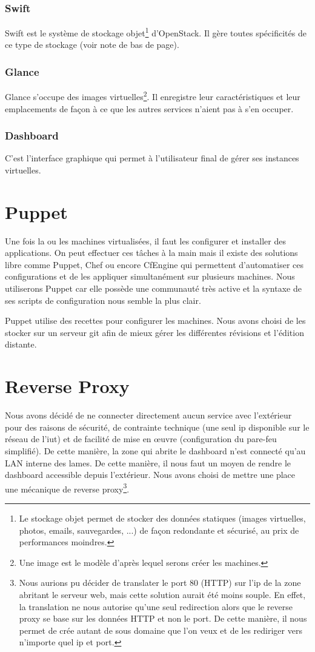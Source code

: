 \documentclass{report}
\begin{document}
\subsubsection{Swift}
Swift est le système de stockage objet\footnote{Le stockage objet permet de stocker des données statiques (images virtuelles, photos, emails, sauvegardes, ...) de façon redondante et sécurisé, au prix de performances moindres.} d'OpenStack. Il gère toutes spécificités de ce type de stockage (voir note de bas de page).

\subsubsection{Glance}
Glance s'occupe des images virtuelles\footnote{Une image est le modèle d'après lequel serons créer les machines.}. Il enregistre leur caractéristiques et leur emplacements de façon à ce que les autres services n'aient pas à s'en occuper.

\subsubsection{Dashboard}
C'est l'interface graphique qui permet à l'utilisateur final de gérer ses instances virtuelles.

\section{Puppet}
Une fois la ou les machines virtualisées, il faut les configurer et installer des applications. On peut effectuer ces tâches à la main mais il existe des solutions libre comme Puppet, Chef ou encore CfEngine qui permettent d'automatiser ces configurations et de les appliquer simultanément sur plusieurs machines. Nous utiliserons Puppet car elle possède une communauté très active et la syntaxe de ses scripts de configuration nous semble la plus clair.

Puppet utilise des recettes pour configurer les machines. Nous avons choisi de les stocker sur un serveur git afin de mieux gérer les différentes révisions et l'édition distante.

\section{Reverse Proxy}
Nous avons décidé de ne connecter directement aucun service avec l'extérieur pour des raisons de sécurité, de contrainte technique (une seul ip disponible sur le réseau de l'iut) et de facilité de mise en œuvre (configuration du pare-feu simplifié). De cette manière, la zone qui abrite le dashboard n'est connecté qu'au LAN interne des lames. De cette manière, il nous faut un moyen de rendre le dashboard accessible depuis l'extérieur. Nous avons choisi de mettre une place une mécanique de reverse proxy\footnote{Nous aurions pu décider de translater le port 80 (HTTP) sur l'ip de la zone abritant le serveur web, mais cette solution aurait été moins souple. En effet, la translation ne nous autorise qu'une seul redirection alors que le reverse proxy se base sur les données HTTP et non le port. De cette manière, il nous permet de crée autant de sous domaine que l'on veux et de les rediriger vers n'importe quel ip et port.}.
\end{document}

